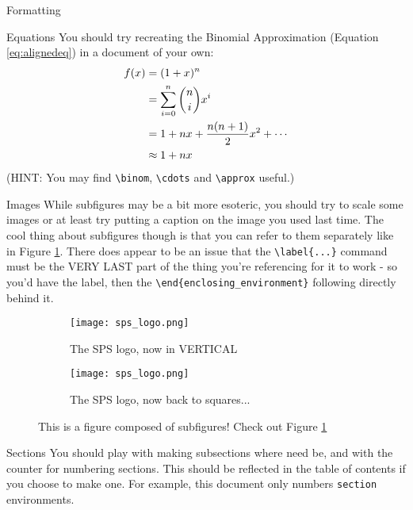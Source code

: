 \documentclass[onecolumn]{article}
\begin{document}
\begin{section}{Formatting}
\begin{subsection}{Equations}
	You should try recreating the Binomial Approximation (Equation \ref{eq:alignedeq}) in a document of your own:
	\begin{align}
		f(x)&=(1+x)^n \notag \\
		&=\sum_{i=0}^{n}\binom{n}{i}x^i  \notag \\
		&=1+nx+\frac{n(n+1)}{2}x^2+\cdots \notag \\
		&\approx1+nx\label{eq:alignedeq}
	\end{align}
	(HINT: You may find \verb+\binom+, \verb+\cdots+ and \verb+\approx+ useful.)
\end{subsection}

\begin{subsection}{Images}
	While subfigures may be a bit more esoteric, you should try to scale some images or at least try putting a caption on the image you used last time. The cool thing about subfigures
	though is that you can refer to them separately like in Figure \ref{fig:fdsaa}. There does appear to be an issue that the \verb+\label{...}+ command must be the VERY LAST part
	of the thing you're referencing for it to work - so you'd have the label, then the \verb+\end{enclosing_environment}+ following directly behind it.
	\begin{figure}
		\begin{subfigure}[b]{.5\textwidth}
			\centering
			\texttt{[image: sps\_logo.png]}
			\caption{The SPS logo, now in VERTICAL}\label{fig:fdsaa}
		\end{subfigure}
		\begin{subfigure}[b]{.5\textwidth}
			\centering
			\texttt{[image: sps\_logo.png]}
			\caption{The SPS logo, now back to squares...}
		\end{subfigure}
	\caption{This is a figure composed of subfigures! Check out Figure \ref{fig:fdsaa}}\label{fig:fdsa}
	\end{figure}
\end{subsection}

\begin{subsection}{Sections}
	You should play with making subsections where need be, and with the counter for numbering sections. This should be reflected in the table of contents if you choose to make one.
	For example, this document only numbers \verb+section+ environments.
\end{subsection}


\end{section}
\end{document}
